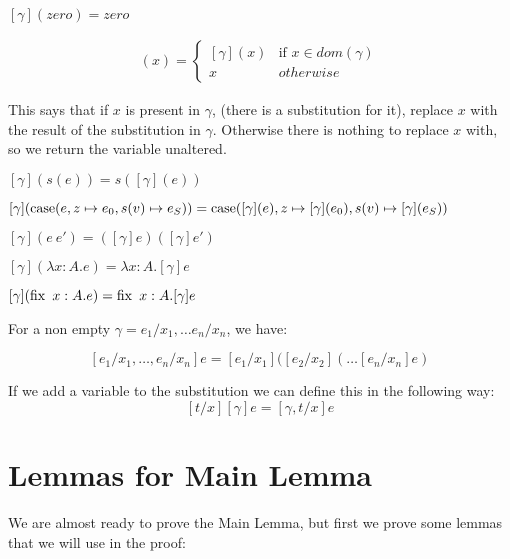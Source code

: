 \begin{adjustwidth}{2cm}{}
$[\gamma](zero) = zero$
\end{adjustwidth}

\begin{minipage}{3.5in}
\begin{align*}
[\gamma](x) = 
  \begin{cases} 
           [\gamma](x) & \text{if } x \in dom(\gamma) \\
           x & otherwise 
  \end{cases}
\end{align*} 
\end{minipage}

This says that if $x$ is present in $\gamma$, (there is a substitution for it), replace $x$ with the result of the substitution in $\gamma$. Otherwise there is nothing to replace $x$ with, so we return the variable unaltered. 

\vspace{0.5cm}

\begin{adjustwidth}{2cm}{}

$[\gamma](s(e)) = s([\gamma] (e))$

$[\gamma](\operatorname{case} (e, z \mapsto e_0, s(v) \mapsto e_S)) = \operatorname{case} ([\gamma](e), z \mapsto [\gamma](e_0), s(v) \mapsto [\gamma](e_S))$

$[\gamma](e \ e') = ([\gamma] e) ([\gamma] e')$

$[\gamma] (\lambda x:A. e) = \lambda x:A. [\gamma] e$

$[\gamma] (\operatorname{fix} \ x:A. e) = \operatorname{fix} \ x:A. [\gamma] e$
\end{adjustwidth}

\vspace{0.5cm}

For a non empty $\gamma = e_1/x_1, \dots e_n/x_n$, we have:

\[ [e_1/x_1, \dots , e_n/x_n] e = [e_1/x_1]([e_2/x_2]( \dots [e_n/x_n] e) \]

If we add a variable to the substitution we can define this in the following way:
\[ [t/x][\gamma] e = [\gamma, t/x] e \]

\section{Lemmas for Main Lemma}
We are almost ready to prove the Main Lemma, but first we prove some lemmas that we will use in the proof:


